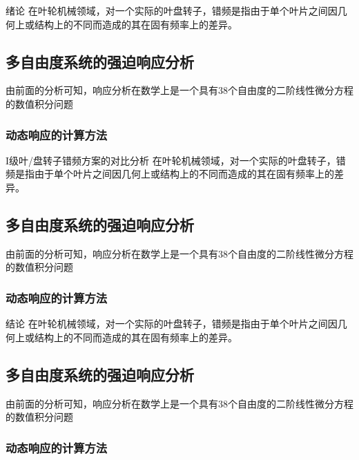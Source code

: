 \documentclass[UTF8, a4paper, openany, twoside]{ctexart}
\begin{document}
\makecover


\thispagestyle{fancy}
\tableofcontents

\cleardoublepage

\setcounter{page}{1}

\begin{chapter}{绪论}
    在叶轮机械领域，对一个实际的叶盘转子，错频是指由于单个叶片之间因几何上或结构上的不同而造成的其在固有频率上的差异。
    \subsection{多自由度系统的强迫响应分析}
    由前面的分析可知，响应分析在数学上是一个具有38个自由度的二阶线性微分方程的数值积分问题
    \subsubsection{动态响应的计算方法}
\end{chapter}

\begin{chapter}{I级叶/盘转子错频方案的对比分析}
    在叶轮机械领域，对一个实际的叶盘转子，错频是指由于单个叶片之间因几何上或结构上的不同而造成的其在固有频率上的差异。
    \subsection{多自由度系统的强迫响应分析}
    由前面的分析可知，响应分析在数学上是一个具有38个自由度的二阶线性微分方程的数值积分问题
    \subsubsection{动态响应的计算方法}
\end{chapter}

\begin{chapter}{结论}
    在叶轮机械领域，对一个实际的叶盘转子，错频是指由于单个叶片之间因几何上或结构上的不同而造成的其在固有频率上的差异。
    \subsection{多自由度系统的强迫响应分析}
    由前面的分析可知，响应分析在数学上是一个具有38个自由度的二阶线性微分方程的数值积分问题
    \subsubsection{动态响应的计算方法}
\end{chapter}
\end{document}
